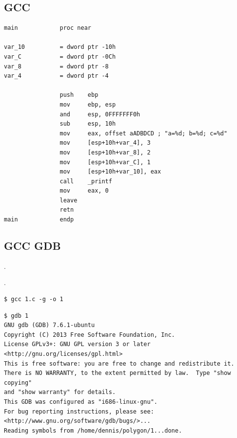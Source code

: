 \subsection{GCC}


\begin{lstlisting}
main            proc near

var_10          = dword ptr -10h
var_C           = dword ptr -0Ch
var_8           = dword ptr -8
var_4           = dword ptr -4

                push    ebp
                mov     ebp, esp
                and     esp, 0FFFFFFF0h
                sub     esp, 10h
                mov     eax, offset aADBDCD ; "a=%d; b=%d; c=%d"
                mov     [esp+10h+var_4], 3
                mov     [esp+10h+var_8], 2
                mov     [esp+10h+var_C], 1
                mov     [esp+10h+var_10], eax
                call    _printf
                mov     eax, 0
                leave
                retn
main            endp
\end{lstlisting}


\subsection{GCC \AndENRU GDB}

.

 .

\begin{lstlisting}
$ gcc 1.c -g -o 1
\end{lstlisting}

\begin{lstlisting}
$ gdb 1
GNU gdb (GDB) 7.6.1-ubuntu
Copyright (C) 2013 Free Software Foundation, Inc.
License GPLv3+: GNU GPL version 3 or later <http://gnu.org/licenses/gpl.html>
This is free software: you are free to change and redistribute it.
There is NO WARRANTY, to the extent permitted by law.  Type "show copying"
and "show warranty" for details.
This GDB was configured as "i686-linux-gnu".
For bug reporting instructions, please see:
<http://www.gnu.org/software/gdb/bugs/>...
Reading symbols from /home/dennis/polygon/1...done.
\end{lstlisting}

